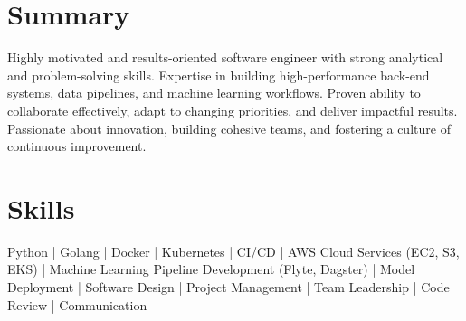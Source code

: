 %
%

\section{Summary}

\raggedright

Highly motivated and results-oriented software engineer with strong analytical and problem-solving skills. Expertise in building high-performance back-end systems, data pipelines, and machine learning workflows. Proven ability to collaborate effectively, adapt to changing priorities, and deliver impactful results. Passionate about innovation, building cohesive teams, and fostering a culture of continuous improvement.

\sectionsep

\section{Skills}

Python | Golang | Docker | Kubernetes | CI/CD | AWS Cloud Services (EC2, S3, EKS) | Machine Learning Pipeline Development (Flyte, Dagster) | Model Deployment | Software Design | Project Management | Team Leadership | Code Review | Communication

\sectionsep


